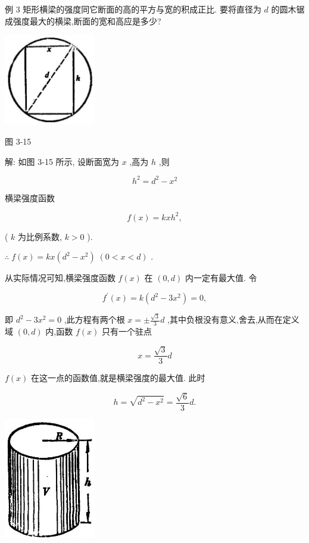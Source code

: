 \documentclass[lang=cn,newtx,12pt,scheme=chinese]{elegantbook}
\begin{document}
例 3 矩形横梁的强度同它断面的高的平方与宽的积成正比. 要将直径为 \(d\) 的圆木锯成强度最大的横梁,断面的宽和高应是多少?

\begin{center}
\includegraphics[max width=0.3\textwidth]{images/01912c18-5c3f-733d-b775-749ba9897a9d_150_941467.jpg}
\end{center}

图 3-15

解: 如图 3-15 所示, 设断面宽为 \(x\) ,高为 \(h\) ,则

\[
{h}^{2} = {d}^{2} - {x}^{2}
\]

横梁强度函数

\[
f\left( x\right) = {kx}{h}^{2},
\]

( \(k\) 为比例系数, \(k > 0\) ).

\(\therefore \;f\left( x\right) = {kx}\left( {{d}^{2} - {x}^{2}}\right) \;\left( {0 < x < d}\right)\) .

从实际情况可知,横梁强度函数 \(f\left( x\right)\) 在 \(\left( {0,d}\right)\) 内一定有最大值. 令

\[
{f}^{\prime }\left( x\right) = k\left( {{d}^{2} - 3{x}^{2}}\right) = 0,
\]

即 \({d}^{2} - 3{x}^{2} = 0\) ,此方程有两个根 \(x = \pm \frac{\sqrt{3}}{3}d\) ,其中负根没有意义,舍去,从而在定义域 \(\left( {0,d}\right)\) 内,函数 \(f\left( x\right)\) 只有一个驻点

\[
x = \frac{\sqrt{3}}{3}d
\]

\(f\left( x\right)\) 在这一点的函数值,就是横梁强度的最大值. 此时

\[
h = \sqrt{{d}^{2} - {x}^{2}} = \frac{\sqrt{6}}{3}d.
\]

\begin{center}
\includegraphics[max width=0.3\textwidth]{images/01912c18-5c3f-733d-b775-749ba9897a9d_150_751406.jpg}
\end{center}
\end{document}
